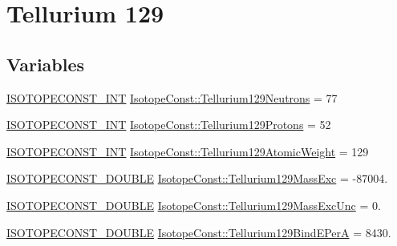 \hypertarget{group___isotope_const-_tellurium-_te129}{}\section{Tellurium 129}
\label{group___isotope_const-_tellurium-_te129}
\subsection*{Variables}
\begin{DoxyCompactItemize}
\item 
\mbox{\hyperlink{group___isotope_const-_macros_ga5f18360b3e99483a35c32d789e62621c}{I\+S\+O\+T\+O\+P\+E\+C\+O\+N\+S\+T\+\_\+\+I\+NT}} \mbox{\hyperlink{group___isotope_const-_tellurium-_te129_gad8f939dc93685e20353acb4f731f253d}{Isotope\+Const\+::\+Tellurium129\+Neutrons}} = 77
\item 
\mbox{\hyperlink{group___isotope_const-_macros_ga5f18360b3e99483a35c32d789e62621c}{I\+S\+O\+T\+O\+P\+E\+C\+O\+N\+S\+T\+\_\+\+I\+NT}} \mbox{\hyperlink{group___isotope_const-_tellurium-_te129_ga46d81286ac1d2b41a9a93f7f2b07fe74}{Isotope\+Const\+::\+Tellurium129\+Protons}} = 52
\item 
\mbox{\hyperlink{group___isotope_const-_macros_ga5f18360b3e99483a35c32d789e62621c}{I\+S\+O\+T\+O\+P\+E\+C\+O\+N\+S\+T\+\_\+\+I\+NT}} \mbox{\hyperlink{group___isotope_const-_tellurium-_te129_gacbe9e9e88a4fed6d9626c79320a2d1c3}{Isotope\+Const\+::\+Tellurium129\+Atomic\+Weight}} = 129
\item 
\mbox{\hyperlink{group___isotope_const-_macros_ga8f45a7272ce02c0b4c65c44636ed719a}{I\+S\+O\+T\+O\+P\+E\+C\+O\+N\+S\+T\+\_\+\+D\+O\+U\+B\+LE}} \mbox{\hyperlink{group___isotope_const-_tellurium-_te129_ga741b46f71c62bb589be784b1e453249e}{Isotope\+Const\+::\+Tellurium129\+Mass\+Exc}} = -\/87004.
\item 
\mbox{\hyperlink{group___isotope_const-_macros_ga8f45a7272ce02c0b4c65c44636ed719a}{I\+S\+O\+T\+O\+P\+E\+C\+O\+N\+S\+T\+\_\+\+D\+O\+U\+B\+LE}} \mbox{\hyperlink{group___isotope_const-_tellurium-_te129_gae29c6ae5995428c3ab836b8a692aaf4f}{Isotope\+Const\+::\+Tellurium129\+Mass\+Exc\+Unc}} = 0.
\item 
\mbox{\hyperlink{group___isotope_const-_macros_ga8f45a7272ce02c0b4c65c44636ed719a}{I\+S\+O\+T\+O\+P\+E\+C\+O\+N\+S\+T\+\_\+\+D\+O\+U\+B\+LE}} \mbox{\hyperlink{group___isotope_const-_tellurium-_te129_ga114955878d4dbb2b35b2d4be284692fc}{Isotope\+Const\+::\+Tellurium129\+Bind\+E\+PerA}} = 8430.
\item 

\end{DoxyCompactItemize}
